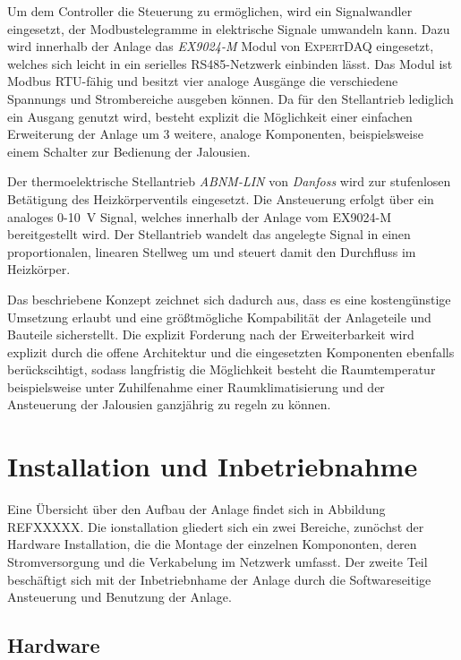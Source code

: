 Um dem Controller die Steuerung zu ermöglichen, wird ein Signalwandler eingesetzt, der Modbustelegramme in elektrische Signale umwandeln kann. Dazu wird innerhalb der Anlage das \textit{EX9024-M} Modul von \textsc{ExpertDAQ} eingesetzt, welches sich leicht in ein serielles RS485-Netzwerk einbinden lässt. Das Modul ist Modbus RTU-fähig und besitzt vier analoge Ausgänge die verschiedene Spannungs und Strombereiche ausgeben können. Da für den Stellantrieb lediglich ein Ausgang genutzt wird, besteht explizit die Möglichkeit einer einfachen Erweiterung der Anlage um 3 weitere, analoge Komponenten, beispielsweise einem Schalter zur Bedienung  der Jalousien.

Der thermoelektrische Stellantrieb \textit{ABNM-LIN} von \textit{Danfoss} wird zur stufenlosen Betätigung des Heizkörperventils eingesetzt. Die Ansteuerung erfolgt über ein analoges 0-10~V Signal, welches innerhalb der Anlage vom EX9024-M bereitgestellt wird. Der Stellantrieb wandelt das angelegte Signal in einen proportionalen, linearen Stellweg um und steuert damit den Durchfluss im Heizkörper.


Das beschriebene Konzept zeichnet sich dadurch aus, dass es eine kostengünstige Umsetzung erlaubt und eine größtmögliche Kompabilität der Anlageteile und Bauteile sicherstellt. Die explizit Forderung nach der Erweiterbarkeit wird explizit durch die offene Architektur und die eingesetzten Komponenten ebenfalls berückscihtigt, sodass langfristig die Möglichkeit besteht die Raumtemperatur beispielsweise unter Zuhilfenahme einer Raumklimatisierung und der Ansteuerung der Jalousien ganzjährig zu regeln zu können.

\section{Installation und Inbetriebnahme}

Eine Übersicht über den Aufbau der Anlage findet sich in Abbildung REFXXXXX. Die ionstallation gliedert sich ein zwei Bereiche, zunöchst der Hardware Installation, die die  Montage der einzelnen Kompononten, deren Stromversorgung und die Verkabelung im Netzwerk umfasst.
Der zweite Teil beschäftigt sich mit der Inbetriebnhame der Anlage durch die Softwareseitige Ansteuerung und Benutzung der Anlage.


\subsection{Hardware}

